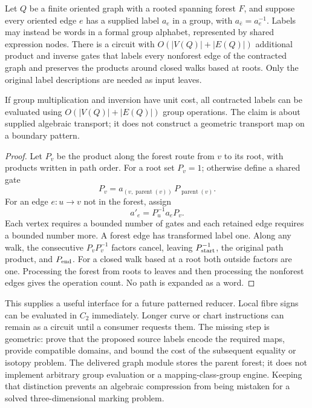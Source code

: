 \begin{proposition}
\label{prop:forest-transport}
Let $Q$ be a finite oriented graph with a rooted spanning forest $F$, and
suppose every oriented edge $e$ has a supplied label $a_e$ in a group,
with $a_{\bar e}=a_e^{-1}$.  Labels may instead be words in a formal group
alphabet, represented by shared expression nodes.  There is a circuit with
$O(|V(Q)|+|E(Q)|)$ additional product and inverse gates that labels every
nonforest edge of the contracted graph and preserves the products around
closed walks based at roots.  Only the original label descriptions are
needed as input leaves.

If group multiplication and inversion have unit cost, all contracted
labels can be evaluated using $O(|V(Q)|+|E(Q)|)$ group operations.  The
claim is about supplied algebraic transport; it does not construct a
geometric transport map on a boundary pattern.
\end{proposition}
\begin{proof}
Let $P_v$ be the product along the forest route from $v$ to its root,
with products written in path order.  For a root set $P_v=1$; otherwise
define a shared gate
\[
 P_v=a_{(v,\operatorname{parent}(v))}\,P_{\operatorname{parent}(v)}.
\]
For an edge $e:u\longrightarrow v$ not in the forest, assign
\[
                   a'_e=P_u^{-1}a_eP_v.
\]
Each vertex requires a bounded number of gates and each retained edge
requires a bounded number more.  A forest edge has transformed label one.
Along any walk, the consecutive $P_vP_v^{-1}$ factors cancel, leaving
$P_{\rm start}^{-1}$, the original path product, and $P_{\rm end}$.
For a closed walk based at a root both outside factors are one.  Processing
the forest from roots to leaves and then processing the nonforest edges
gives the operation count.  No path is expanded as a word.
\end{proof}

This supplies a useful interface for a future patterned reducer.  Local
fibre signs can be evaluated in $C_2$ immediately.  Longer curve or chart
instructions can remain as a circuit until a consumer requests them.
The missing step is geometric: prove that the proposed source labels
encode the required maps, provide compatible domains, and bound the cost
of the subsequent equality or isotopy problem.  The delivered graph
module stores the parent forest; it does not implement arbitrary group
evaluation or a mapping-class-group engine.  Keeping that distinction
prevents an algebraic compression from being mistaken for a solved
three-dimensional marking problem.

